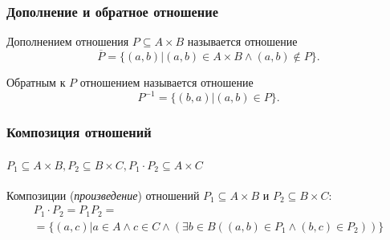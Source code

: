 \begin{frame}
    \frametitle{Дополнение и обратное отношение}
    
    \alert{Дополнением} отношения $P\subseteq A\times B$ называется отношение
    \[\overline{P}=\{(a,b)|(a,b)\in A\times B\land (a,b)\not\in P\}.\]

    \alert{Обратным} к $P$ отношением называется отношение
    \[P^{-1}=\{(b,a)|(a,b)\in P\}.\]
\end{frame}

\begin{frame}
    \frametitle{Композиция отношений}
    \framesubtitle{$P_1\subseteq A\times B, P_2\subseteq B\times C, P_1\cdot P_2\subseteq A\times C$}
    
    \alert{Композиции} (\emph{произведение}) отношений $P_1\subseteq A\times B$ и $P_2\subseteq B\times C$:
    \[
        \begin{split}
            P_1\cdot P_2 = P_1P_2 = \\
            = \{(a,c)|a\in A\land c\in C\land (\exists b\in B \left((a,b)\in P_1\land (b,c)\in P_2\right))\}
        \end{split}
    \]
\end{frame}

